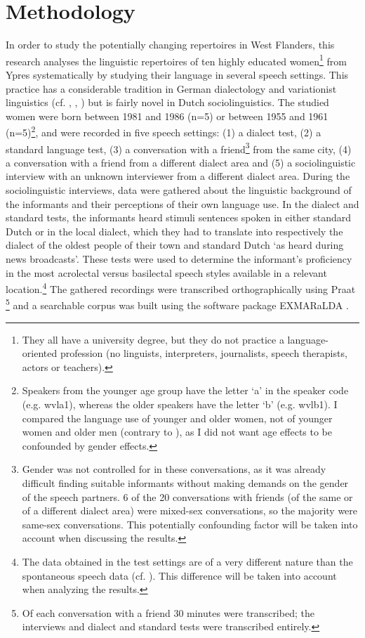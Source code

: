 \documentclass[output=paper]{LSP/langsci}
\begin{document}
\section{Methodology}
\label{sec:methodology}

\largerpage
In order to study the potentially changing repertoires in West Flanders, this research analyses the linguistic repertoires of ten highly educated women\footnote{They all have a university degree, but they do not practice a language-oriented profession (no linguists, interpreters, journalists, speech therapists, actors or teachers).} from Ypres systematically by studying their language in several speech settings. This practice has a considerable tradition in German dialectology and variationist linguistics (cf. \citealt{kehrein_regionalsprachliche_2012}, \citealt{lenz_struktur_2003}, \citealt{stellmacher_studien_1977}) but is fairly novel in Dutch sociolinguistics. The studied women were born between 1981 and 1986 (n=5) or between 1955 and 1961 (n=5)\footnote{ Speakers from the younger age group have the letter ‘a’ in the speaker code (e.g. wvla1), whereas the older speakers have the letter ‘b’ (e.g. wvlb1). I compared the language use of younger and older women, not of younger women and older men (contrary to \citealt{heeringa_convergence_2014}), as I did not want age effects to be confounded by gender effects. }, and were recorded in five speech settings: (1) a dialect test, (2) a standard language test, (3) a conversation with a friend\footnote{Gender was not controlled for in these conversations, as it was already difficult finding suitable informants without making demands on the gender of the speech partners. 6 of the 20 conversations with friends (of the same or of a different dialect area) were mixed-sex conversations, so the majority were same-sex conversations. This potentially confounding factor will be taken into account when discussing the results.} from the same city, (4) a conversation with a friend from a different dialect area and (5) a sociolinguistic interview with an unknown interviewer from a different dialect area. During the sociolinguistic interviews, data were gathered about the linguistic background of the informants and their perceptions of their own language use. In the dialect and standard tests, the informants heard stimuli sentences spoken in either standard Dutch or in the local dialect, which they had to translate into respectively the dialect of the oldest people of their town and standard Dutch ‘as heard during news broadcasts’. These tests were used to determine the informant’s proficiency in the most acrolectal versus basilectal speech styles available in a relevant location.\footnote{ The data obtained in the test settings are of a very different nature than the spontaneous speech data (cf. \citealt[57--62]{lenz_struktur_2003}). This difference will be taken into account when analyzing the results.} The gathered recordings were transcribed orthographically using Praat \citep{boersma_praat:_2011}\footnote{Of each conversation with a friend 30 minutes were transcribed; the interviews and dialect and standard tests were transcribed entirely.} and a searchable corpus was built using the software package EXMARaLDA \citep{schmidt_exmaralda_2009}.
\end{document}

